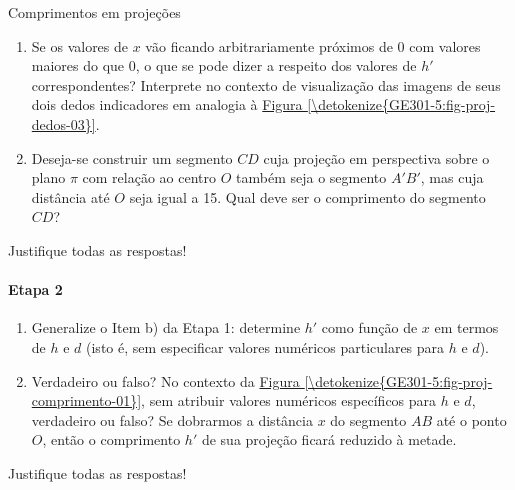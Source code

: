 \begin{task}{Comprimentos em projeções}
\begin{enumerate}
\item {} 
Se os valores de \(x\) vão ficando arbitrariamente próximos de \(0\) com valores maiores do que \(0\), o que se pode dizer a respeito dos valores de \(h'\) correspondentes? Interprete no contexto de visualização das imagens de seus dois dedos indicadores em analogia à \hyperref[\detokenize{GE301-5:fig-proj-dedos-03}]{Figura \ref{\detokenize{GE301-5:fig-proj-dedos-03}}}.

\item {} 
Deseja-se construir um segmento \(CD\) cuja projeção em perspectiva sobre o plano \(\pi\) com relação ao centro \(O\) também seja o segmento \(A'B'\), mas cuja distância até \(O\) seja igual a 15. Qual deve ser o comprimento do segmento \(CD\)?

\end{enumerate}

Justifique todas as respostas!

\needspace{.15\textheight}

\paragraph{Etapa 2}
\begin{enumerate}
\item {} 
Generalize o Item b) da Etapa 1: determine \(h'\) como função de \(x\) em termos de \(h\) e \(d\) (isto é, sem especificar valores numéricos particulares para \(h\) e \(d\)).

\item {} 
Verdadeiro ou falso? No contexto da \hyperref[\detokenize{GE301-5:fig-proj-comprimento-01}]{Figura \ref{\detokenize{GE301-5:fig-proj-comprimento-01}}}, sem atribuir valores numéricos específicos para \(h\) e \(d\), verdadeiro ou falso? Se dobrarmos a distância \(x\) do segmento \(AB\) até o ponto \(O\), então o comprimento \(h'\) de sua projeção ficará reduzido à metade.

\end{enumerate}

Justifique todas as respostas!

\needspace{.10\textheight}


\end{task}
